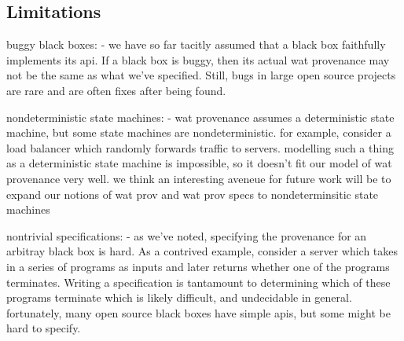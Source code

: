 \subsection{Limitations}
buggy black boxes:
  - we have so far tacitly assumed that a black box faithfully implements its api. If a black box is buggy, then its actual wat provenance may not be the same as what we've specified. Still, bugs in large open source projects are rare and are often fixes after being found.

nondeterministic state machines:
  - wat provenance assumes a deterministic state machine, but some state machines are nondeterministic. for example, consider a load balancer which randomly forwards traffic to servers. modelling such a thing as a deterministic state machine is impossible, so it doesn't fit our model of wat provenance very well. we think an interesting aveneue for future work will be to expand our notions of wat prov and wat prov specs to nondeterminsitic state machines

nontrivial specifications:
  - as we've noted, specifying the provenance for an arbitray black box is hard. As a contrived example, consider a server which takes in a series of programs as inputs and later returns whether one of the programs terminates. Writing a specification is tantamount to determining which of these programs terminate which is likely difficult, and undecidable in general. fortunately, many open source black boxes have simple apis, but some might be hard to specify.
